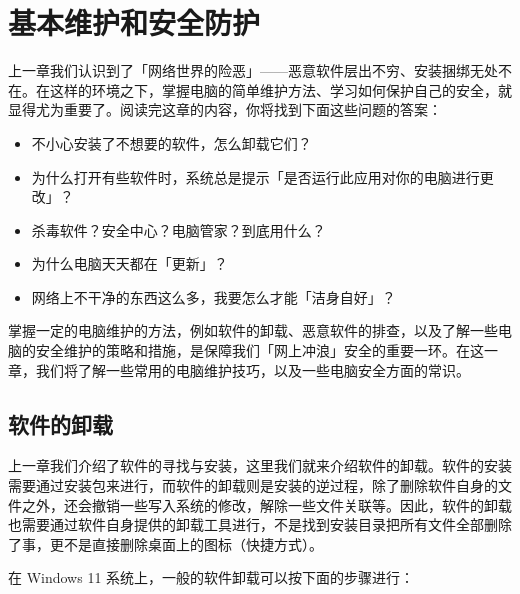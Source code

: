 \chapter{基本维护和安全防护}
\label{cha:basic-maintenance}

\begin{intro}
  上一章我们认识到了「网络世界的险恶」——恶意软件层出不穷、安装捆绑无处不在。在这样的环境之下，掌握电脑的简单维护方法、学习如何保护自己的安全，就显得尤为重要了。阅读完这章的内容，你将找到下面这些问题的答案：
  \begin{itemize}
    \item 不小心安装了不想要的软件，怎么卸载它们？
    \item 为什么打开有些软件时，系统总是提示「是否运行此应用对你的电脑进行更改」？
    \item 杀毒软件？安全中心？电脑管家？到底用什么？
    \item 为什么电脑天天都在「更新」？
    \item 网络上不干净的东西这么多，我要怎么才能「洁身自好」？
  \end{itemize}
\end{intro}

掌握一定的电脑维护的方法，例如软件的卸载、恶意软件的排查，以及了解一些电脑的安全维护的策略和措施，是保障我们「网上冲浪」安全的重要一环。在这一章，我们将了解一些常用的电脑维护技巧，以及一些电脑安全方面的常识。

\section{软件的卸载}

上一章我们介绍了软件的寻找与安装，这里我们就来介绍软件的卸载。软件的安装需要通过安装包来进行，而软件的卸载则是安装的逆过程，除了删除软件自身的文件之外，还会撤销一些写入系统的修改，解除一些文件关联等。因此，软件的卸载也需要通过软件自身提供的卸载工具进行，不是找到安装目录把所有文件全部删除了事，更不是直接删除桌面上的图标（快捷方式）。

在 Windows 11 系统上，一般的软件卸载可以按下面的步骤进行：

